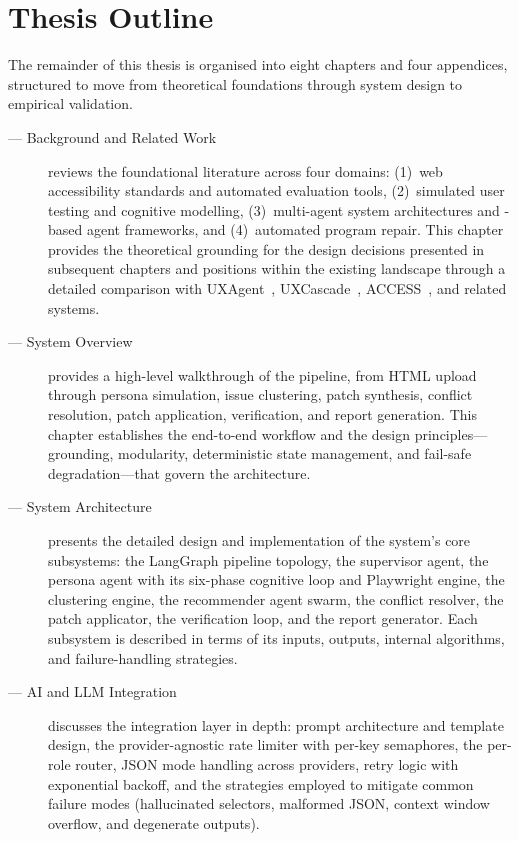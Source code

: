 \section{Thesis Outline}
\label{sec:outline}

The remainder of this thesis is organised into eight chapters and four appendices, structured to move from theoretical foundations through system design to empirical validation.

\begin{description}
  \item[ --- Background and Related Work] reviews the foundational literature across four domains: (1)~web accessibility standards and automated evaluation tools, (2)~simulated user testing and cognitive modelling, (3)~multi-agent system architectures and -based agent frameworks, and (4)~automated program repair. This chapter provides the theoretical grounding for the design decisions presented in subsequent chapters and positions \versimux{} within the existing landscape through a detailed comparison with UXAgent~\cite{uxagent}, UXCascade~\cite{uxcascade}, ACCESS~\cite{access}, and related systems.

  \item[ --- System Overview] provides a high-level walkthrough of the \versimux{} pipeline, from HTML upload through persona simulation, issue clustering, patch synthesis, conflict resolution, patch application, verification, and report generation. This chapter establishes the end-to-end workflow and the design principles---grounding, modularity, deterministic state management, and fail-safe degradation---that govern the architecture.

  \item[ --- System Architecture] presents the detailed design and implementation of the system's core subsystems: the LangGraph pipeline topology, the supervisor agent, the persona agent with its six-phase cognitive loop and Playwright engine, the clustering engine, the recommender agent swarm, the conflict resolver, the patch applicator, the verification loop, and the report generator. Each subsystem is described in terms of its inputs, outputs, internal algorithms, and failure-handling strategies.

  \item[ --- AI and LLM Integration] discusses the  integration layer in depth: prompt architecture and template design, the provider-agnostic rate limiter with per-key semaphores, the per-role  router, JSON mode handling across providers, retry logic with exponential backoff, and the strategies employed to mitigate common  failure modes (hallucinated selectors, malformed JSON, context window overflow, and degenerate outputs).


\end{description}
